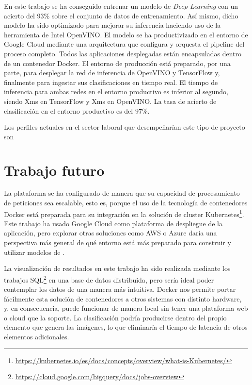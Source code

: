 En este trabajo se ha conseguido entrenar un modelo de \textit{Deep Learning} con un acierto del 93\% sobre el conjunto de datos de entrenamiento.
Así mismo, dicho modelo ha sido optimizado para mejorar su inferencia haciendo uso de la herramienta de Intel OpenVINO\@.
El modelo se ha productivizado en el entorno de Google Cloud mediante una arquitectura que configura y orquesta el pipeline del proceso completo. Todos las aplicaciones desplegadas están encapsuladas dentro de un contenedor Docker.
El entorno de producción está preparado, por una parte, para desplegar la red de inferencia de OpenVINO y TensorFlow y, finalmente para ingestar sus clasificaciones en tiempo real.
El tiempo de inferencia para ambas redes en el entorno productivo es inferior al segundo, siendo Xms en TensorFlow y Xms en OpenVINO\@.
La tasa de acierto de clasificación en el entorno productivo es del 97\%.

Los perfiles actuales en el sector laboral que desempeñarían este tipo de proyecto son

\section{Trabajo futuro}\label{sec:trabajo-futuro}
La plataforma se ha configurado de manera que su capacidad de procesamiento de peticiones sea escalable, esto es, porque el uso de la tecnología de contenedores Docker está preparada para su integración en la solución de cluster Kubernetes\footnote{\url{https://kubernetes.io/es/docs/concepts/overview/what-is-Kubernetes/}}.
Este trabajo ha usado Google Cloud como plataforma de despliegue de la aplicación, pero explorar otras soluciones como AWS o Azure daría una perspectiva más general de qué entorno está más preparado para construir y utilizar modelos de .

La visualización de resultados en este trabajo ha sido realizada mediante los trabajos SQL\footnote{\url{https://cloud.google.com/bigquery/docs/jobs-overview}} en una base de datos distribuida, pero sería ideal poder contemplar los datos de una manera más intuitiva.
Docker nos permite portar fácilmente esta solución de contenedores a otros sistemas con distinto hardware, y, en consecuencia, puede funcionar de manera local sin tener una plataforma web o cloud que la soporte.
La clasificación podría producirse dentro del propio elemento que genera las imágenes, lo que eliminaría el tiempo de latencia de otros elementos adicionales.

